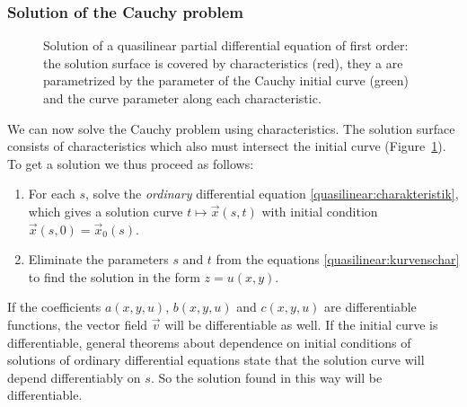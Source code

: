 \subsubsection{Solution of the Cauchy problem}
\begin{figure}
\centering
{}
\caption{Solution of a quasilinear partial differential equation
of first order: the solution surface is covered by characteristics (red),
they a are parametrized by the parameter of the Cauchy initial curve
(green) and the curve parameter along each characteristic.
\label{geometrie:loesung-mit-charakteristiken}}
\end{figure}
We can now solve the Cauchy problem using characteristics.
The solution surface consists of characteristics which also must
intersect the initial curve
(Figure~\ref{geometrie:loesung-mit-charakteristiken}).
To get a solution we thus proceed as follows:
\begin{enumerate}
\item
For each $s$, solve the {\em ordinary} differential equation
\eqref{quasilinear:charakteristik}, which gives a solution curve
$t\mapsto \vec x(s,t)$ with initial condition
$\vec x(s,0)=\vec x_0(s)$.
\item 
Eliminate the parameters $s$ and $t$ from the equations
\eqref{quasilinear:kurvenschar} to find the solution in the form
$z=u(x,y)$.
\end{enumerate}

If the coefficients $a(x,y,u)$, $b(x,y,u)$ and $c(x,y,u)$ are
differentiable functions, the vector field $\vec{v}$ will be differentiable
as well.
If the initial curve is differentiable, general theorems about dependence
on initial conditions of solutions of ordinary differential equations
state that the solution curve will depend differentiably on $s$.
So the solution found in this way will be differentiable.

